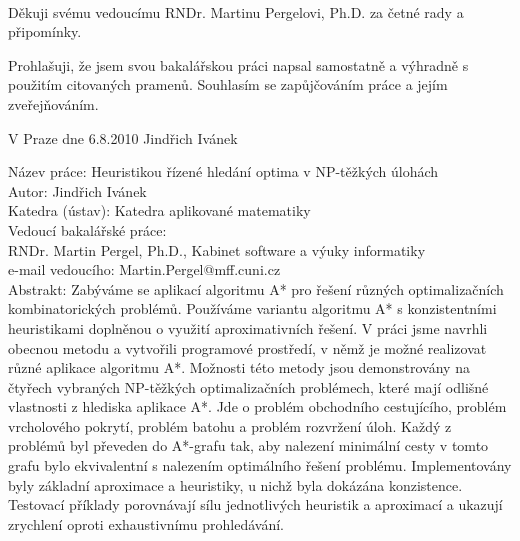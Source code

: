 \documentclass[12pt,notitlepage,fleqn]{report} %
\theoremstyle{definition}
\begin{document}
\normalsize %
\setcounter{page}{2} %
\ \vspace{10mm} 

\noindent Děkuji svému vedoucímu RNDr. Martinu Pergelovi, Ph.D. za četné rady a připomínky. %

\vspace{\fill} %
\noindent Prohlašuji, že jsem svou bakalářskou práci napsal samostatně a výhradně s použitím citovaných pramenů. Souhlasím se zapůjčováním práce a jejím zveřejňováním.

\bigskip
\noindent V Praze dne 6.8.2010 \hspace{\fill}Jindřich Ivánek\\ %


\tableofcontents %

\newpage %

\noindent
Název práce: Heuristikou řízené hledání optima v NP-těžkých úlohách\\
Autor: Jindřich Ivánek\\
Katedra (ústav): Katedra aplikované matematiky\\
Vedoucí bakalářské práce: \\
RNDr. Martin Pergel, Ph.D., Kabinet software a výuky informatiky\\
e-mail vedoucího: Martin.Pergel@mff.cuni.cz\\

\noindent Abstrakt: Zabýváme se aplikací algoritmu A* pro řešení různých optimalizačních kombinatorických problémů. Používáme variantu algoritmu A* s konzistentními heuristikami doplněnou o využití aproximativních řešení. V práci jsme navrhli obecnou metodu a vytvořili programové prostředí, v němž je možné realizovat různé aplikace algoritmu A*.
Možnosti této metody jsou demonstrovány na čtyřech vybraných NP-těžkých optimalizačních problémech, které mají odlišné vlastnosti z hlediska aplikace A*. Jde o problém obchodního cestujícího, problém vrcholového pokrytí, problém batohu a problém rozvržení úloh. Každý z problémů byl převeden do A*-grafu tak, aby nalezení minimální cesty v tomto grafu bylo ekvivalentní s nalezením optimálního řešení problému. Implementovány byly základní aproximace a heuristiky, u nichž byla dokázána konzistence.
Testovací příklady porovnávají sílu jednotlivých heuristik a aproximací a ukazují zrychlení oproti exhaustivnímu prohledávání. \\
\end{document}
